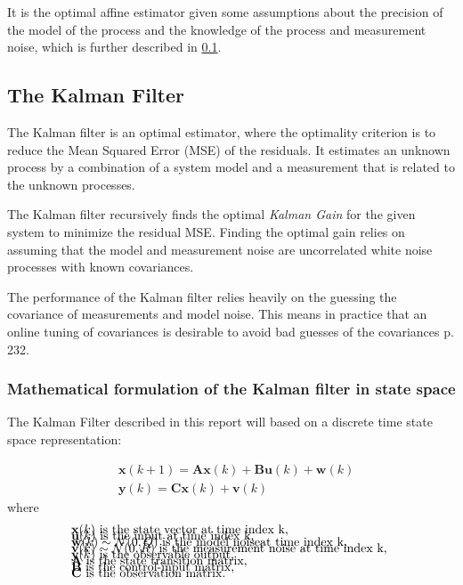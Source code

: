 It is the optimal affine estimator given some assumptions about the precision of the model of the process and the knowledge of the process and measurement noise, which is further described in \cref{sec:the_kalman_filter}.





\subsection{The Kalman Filter} \label{sec:the_kalman_filter}
The Kalman filter is an optimal estimator, where the optimality criterion is to reduce the Mean Squared Error (MSE) of the residuals.
It estimates an unknown process by a combination of a system model and a measurement that is related to the unknown processes. 

The Kalman filter recursively finds the optimal \textit{Kalman Gain} for the given system to minimize the residual MSE. Finding the optimal gain relies on assuming that the model and measurement noise are uncorrelated white noise processes with known covariances. 

The performance of the Kalman filter relies heavily on the guessing the covariance of measurements and model noise. This means in practice that an online tuning of covariances is desirable to avoid bad guesses of the covariances \cite{Doraiswami2014} p. 232.

\subsubsection{Mathematical formulation of the Kalman filter in state space}
The Kalman Filter described in this report will based on a discrete time state space representation: 

\begin{align}
	&\textbf{x}(k+1) = \textbf{A}\textbf{x}(k) + \textbf{B}\textbf{u}(k) + \textbf{w}(k)  \label{eq:KalmanSystemEquations} \\
	&\textbf{y}(k) = \textbf{C}\textbf{x}(k)+\textbf{v}(k) 
\end{align}
where 
\begin{align*}
	&\text{$\textbf{x}(k)$ is the state vector at time index k,					}	\\[-1em]
	&\text{$\textbf{u}(k)$ is the input at time index k, 						}	\\[-1em]
	&\text{$\textbf{w}(k) \sim \mathcal{N}(0, Q)$ is the model noiseat time index k,			}	\\[-1em]
	&\text{$\textbf{v}(k) \sim \mathcal{N}(0, R)$ is the measurement noise at time index k,		}	\\[-1em]
	&\text{$\textbf{y}(k)$ is the observable output, 							}	\\[-1em]
	&\text{\textbf{A} is the state transition matrix,							}	\\[-1em]
	&\text{\textbf{B} is the control-input matrix,								}	\\[-1em]
	&\text{\textbf{C} is the observation matrix. 								}	\\[-1em]
\end{align*}

